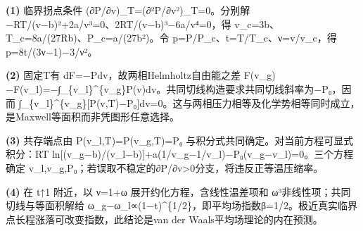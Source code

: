 \par\noindent\textbf{(1)} 临界拐点条件 (∂P/∂v)\_T=(∂²P/∂v²)\_T=0。分别解 −RT/(v−b)²+2a/v³=0、2RT/(v−b)³−6a/v⁴=0，得 v\_c=3b、T\_c=8a/(27Rb)、P\_c=a/(27b²)。令 p=P/P\_c、t=T/T\_c、ν=v/v\_c，得 p=8t/(3ν−1)−3/ν²。
\par\noindent\textbf{(2)} 固定T有 dF=−Pdv，故两相Helmholtz自由能之差 F(v\_g)−F(v\_l)=−∫\_\{v\_l\}\textasciicircum{}\{v\_g\}P(v)dv。共同切线构造要求共同切线斜率为−P₀，因而 ∫\_\{v\_l\}\textasciicircum{}\{v\_g\}[P(v,T)−P₀]dv=0。这与两相压力相等及化学势相等同时成立，是Maxwell等面积而非凭图形任意选择。
\par\noindent\textbf{(3)} 共存端点由 P(v\_l,T)=P(v\_g,T)=P₀ 与积分式共同确定。对当前方程可显式积分：RT ln[(v\_g−b)/(v\_l−b)]+a(1/v\_g−1/v\_l)−P₀(v\_g−v\_l)=0。三个方程确定 v\_l,v\_g,P₀；若误取不稳定的∂P/∂v>0分支，将违反正等温压缩率。
\par\noindent\textbf{(4)} 在 t↑1 附近，以 ν=1+ω 展开约化方程，含线性温差项和 ω³非线性项；共同切线与等面积解给 ω\_g−ω\_l∝(1−t)\textasciicircum{}\{1/2\}，即平均场指数β=1/2。极近真实临界点长程涨落可改变指数，此结论是van der Waals平均场理论的内在预测。
